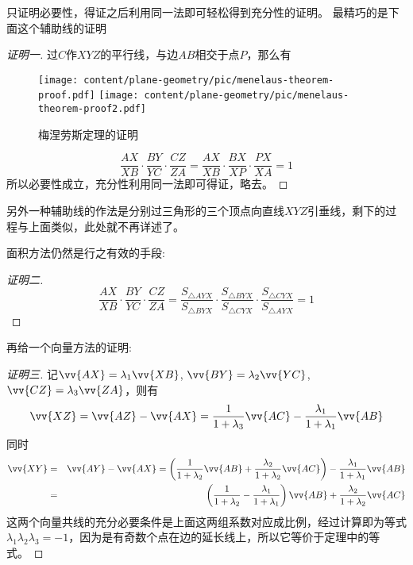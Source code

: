 只证明必要性，得证之后利用同一法即可轻松得到充分性的证明。
最精巧的是下面这个辅助线的证明
\begin{proof}[证明一]
  过$C$作$XYZ$的平行线，与边$AB$相交于点$P$，那么有
 
\begin{figure}[htbp]
\centering
\texttt{[image: content/plane-geometry/pic/menelaus-theorem-proof.pdf]}
\texttt{[image: content/plane-geometry/pic/menelaus-theorem-proof2.pdf]}
\caption{梅涅劳斯定理的证明}
\label{fig:menelaus-theorem-proof}
\end{figure}
 

  \begin{equation*}
    \frac{AX}{XB} \cdot \frac{BY}{YC} \cdot \frac{CZ}{ZA} =
    \frac{AX}{XB} \cdot \frac{BX}{XP} \cdot \frac{PX}{XA} = 1
  \end{equation*}
所以必要性成立，充分性利用同一法即可得证，略去。
\end{proof}

另外一种辅助线的作法是分别过三角形的三个顶点向直线$XYZ$引垂线，剩下的过程与上面类似，此处就不再详述了。

面积方法仍然是行之有效的手段:
\begin{proof}[证明二]
  \begin{equation*}
    \frac{AX}{XB} \cdot \frac{BY}{YC} \cdot \frac{CZ}{ZA} =
    \frac{S_{\triangle AYX}}{S_{\triangle BYX}} \cdot
    \frac{S_{\triangle BYX}}{S_{\triangle CYX}} \cdot
    \frac{S_{\triangle CYX}}{S_{\triangle AYX}} = 1
  \end{equation*}
\end{proof}

再给一个向量方法的证明:
\begin{proof}[证明三]
  记$\vv{AX}=\lambda_1\vv{XB}$, $\vv{BY}=\lambda_2\vv{YC}$, $\vv{CZ}=\lambda_3\vv{ZA}$，则有
  \begin{equation*}
    \vv{XZ} = \vv{AZ}-\vv{AX}=\frac{1}{1+\lambda_3}\vv{AC}-\frac{\lambda_1}{1+\lambda_1}\vv{AB}
  \end{equation*}
  同时
  \begin{eqnarray*}
    \vv{XY} &=& \vv{AY} - \vv{AX} = \left( \frac{1}{1+\lambda_2}\vv{AB}+\frac{\lambda_2}{1+\lambda_2}\vv{AC} \right) - \frac{\lambda_1}{1+\lambda_1}\vv{AB} \\
    &=& \left( \frac{1}{1+\lambda_2}-\frac{\lambda_1}{1+\lambda_1} \right)\vv{AB}+\frac{\lambda_2}{1+\lambda_2}\vv{AC} 
  \end{eqnarray*}
这两个向量共线的充分必要条件是上面这两组系数对应成比例，经过计算即为等式$\lambda_1\lambda_2\lambda_3=-1$，因为是有奇数个点在边的延长线上，所以它等价于定理中的等式。
\end{proof}

